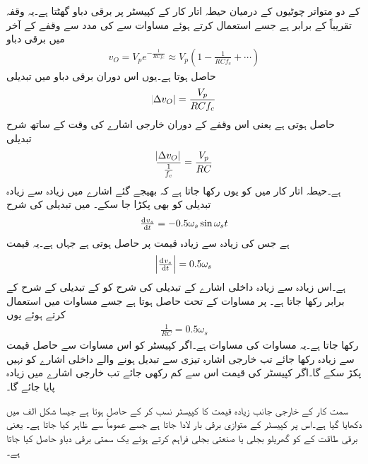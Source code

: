  کے دو متواتر چوٹیوں کے درمیان حیطہ اتار کار کے  کپیسٹر پر برقی دباو گھٹتا ہے۔یہ وقفہ تقریباً  کے برابر ہے جسے استعمال کرتے ہوئے  مساوات  سے  کی مدد سے وقفے کے آخر میں برقی دباو
\begin{align}
v_O=V_{p} e^{-\frac{1}{RC f_c}} \approx V_p \left(1-\frac{1}{RC f_c} +\cdots \right )
\end{align}
حاصل ہوتا ہے۔یوں اس دوران برقی دباو میں تبدیلی
\begin{align*}
\abs{\Delta v_O} =\frac{V_p}{RC f_c}
\end{align*}
حاصل ہوتی ہے یعنی اس وقفے کے دوران خارجی اشارے کی وقت کے ساتھ شرح تبدیلی 
\begin{align}\label{مساوات_ڈایوڈ_حیطہ_اتار_کار_خارجی_اشارہ}
\frac{\abs{\Delta v_O}}{\frac{1}{f_c}} =\frac{V_p}{RC}
\end{align}
ہے۔حیطہ اتار کار میں  کو یوں رکھا جاتا ہے کہ  بھیجے گئے اشارے  میں زیادہ سے زیادہ تبدیلی کو بھی پکڑا جا سکے۔ میں تبدیلی کی شرح
\begin{align*}
\od{v_s}{t}=-0.5 \omega_s \sin \omega_s t
\end{align*}
ہے جس کی زیادہ سے زیادہ قیمت  پر حاصل ہوتی ہے جہاں  ہے۔یہ قیمت 
\begin{align*}
\abs{\od{v_s}{t}}=0.5 \omega_s 
\end{align*} 
ہے۔اس زیادہ سے زیادہ داخلی اشارے کے تبدیلی کی شرح کو  کے تبدیلی کے شرح کے برابر رکھا جاتا ہے۔ پر مساوات  کے تحت  حاصل ہوتا ہے جسے مساوات  میں استعمال کرتے ہوئے یوں
\begin{align}
\frac{1}{RC}=0.5 \omega_s
\end{align}
رکھا جاتا ہے۔یہ مساوات  کی مساوات ہے۔اگر کپیسٹر کو اس مساوات سے حاصل قیمت سے زیادہ رکھا جائے تب خارجی اشارہ تیزی سے تبدیل ہونے والے داخلی اشارے کو نہیں پکڑ سکے گا۔اگر کپیسٹر کی قیمت اس سے کم رکھی جائے تب خارجی اشارے میں  زیادہ پایا جائے گا۔ 

سمت کار کے خارجی جانب زیادہ قیمت کا کپیسٹر نسب کر کے   حاصل ہوتا ہے جیسا شکل  الف میں دکھایا گیا ہے۔اس پر کپیسٹر کے متوازی برقی بار لادا جاتا ہے جسے عموماً  سے ظاہر کیا جاتا ہے۔ یعنی برقی طاقت کے  کو  گھریلو بجلی یا صنعتی بجلی فراہم کرتے ہوئے یک سمتی برقی دباو  حاصل کیا جاتا ہے۔
 
